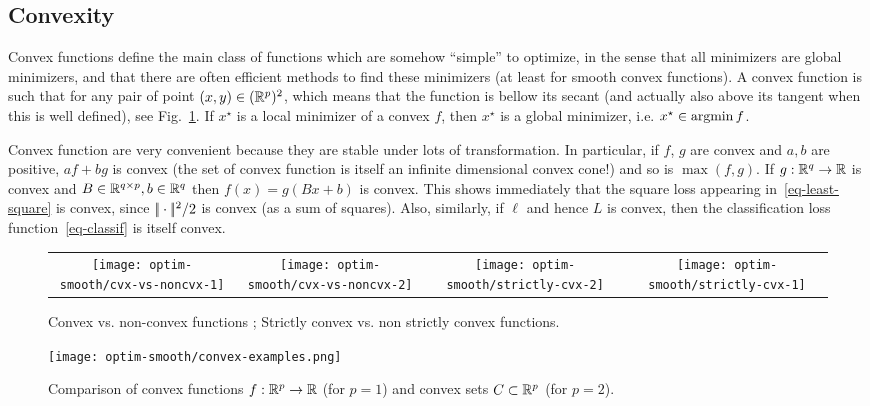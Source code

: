 \subsection{Convexity}

Convex functions define the main class of functions which are somehow ``simple'' to optimize, in the sense that all minimizers are global minimizers, and that there are often efficient methods to find these minimizers (at least for smooth convex functions). A convex function is such that for any pair of point $(x,y) \in (\mathbb{R}^p)^2$, 
which means that the function is bellow its secant (and actually also above its tangent when this is well defined), see Fig.~\ref{fig-cvx-vs-noncvx}. 
%
If $x^\star$ is a local minimizer of a convex $f$, then $x^\star$ is a global minimizer, i.e. $x^\star \in \operatorname{argmin} f$.  


Convex function are very convenient because they are stable under lots of transformation. In particular, if $f$, $g$ are convex and $a, b$ are positive, $a f + b g$ is convex (the set of convex function is itself an infinite dimensional convex cone!) and so is $\max(f,g)$. If $g : \mathbb{R}^q \rightarrow \mathbb{R}$ is convex and $B \in \mathbb{R}^{q \times p}, b \in \mathbb{R}^q$ then $f(x) = g(B x+b)$ is convex. 
%
This shows immediately that the square loss appearing in~\eqref{eq-least-square} is convex, since $|\!| \cdot |\!|^2/2$ is convex (as a sum of squares). 
%
Also, similarly, if $\ell$ and hence $L$ is convex, then the classification loss function~\eqref{eq-classif} is itself convex. 

\begin{figure}
\centering
\begin{tabular}{cccc}
\texttt{[image: optim-smooth/cvx-vs-noncvx-1]} &
\texttt{[image: optim-smooth/cvx-vs-noncvx-2]} &
\texttt{[image: optim-smooth/strictly-cvx-2]} &
\texttt{[image: optim-smooth/strictly-cvx-1]} 
\end{tabular}
\caption{\label{fig-cvx-vs-noncvx}
Convex vs. non-convex functions ; Strictly convex vs. non strictly convex functions.
}
\end{figure}



\begin{figure}
\centering
\texttt{[image: optim-smooth/convex-examples.png]} 
\caption{\label{fig-cvx-set}
Comparison of convex functions $f : \mathbb{R}^p \rightarrow \mathbb{R}$ (for $p=1$) and convex sets $C \subset \mathbb{R}^p$ (for $p=2$).
}
\end{figure}

